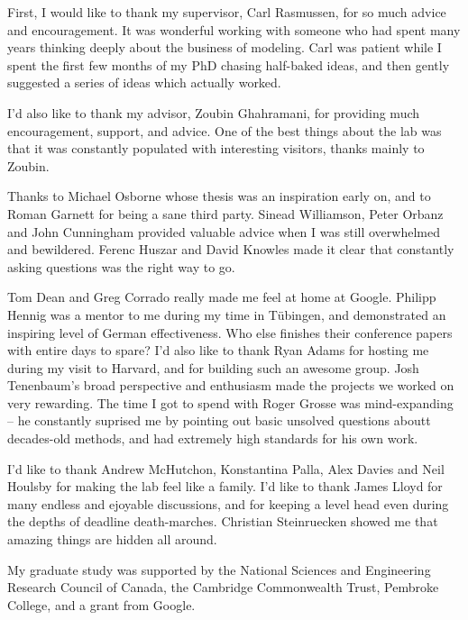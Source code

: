 
\begin{acknowledgements}      


First, I would like to thank my supervisor, Carl Rasmussen, for so much advice and encouragement.
It was wonderful working with someone who had spent many years thinking deeply about the business of modeling.
Carl was patient while I spent the first few months of my PhD chasing half-baked ideas, and then gently suggested a series of ideas which actually worked.

I'd also like to thank my advisor, Zoubin Ghahramani, for providing much encouragement, support, and advice.
One of the best things about the lab was that it was constantly populated with interesting visitors, thanks mainly to Zoubin.

Thanks to Michael Osborne whose thesis was an inspiration early on, and to Roman Garnett for being a sane third party.
Sinead Williamson, Peter Orbanz and John Cunningham provided valuable advice when I was still overwhelmed and bewildered.
Ferenc Huszar and David Knowles made it clear that constantly asking questions was the right way to go.

Tom Dean and Greg Corrado really made me feel at home at Google.
Philipp Hennig was a mentor to me during my time in T\"{u}bingen, and demonstrated an inspiring level of German effectiveness.
Who else finishes their conference papers with entire days to spare?
I'd also like to thank Ryan Adams for hosting me during my visit to Harvard, and for building such an awesome group.
Josh Tenenbaum's broad perspective and enthusiasm made the projects we worked on very rewarding.
The time I got to spend with Roger Grosse was mind-expanding -- he constantly suprised me by pointing out basic unsolved questions aboutt decades-old methods, and had extremely high standards for his own work.

I'd like to thank Andrew McHutchon, Konstantina Palla, Alex Davies and Neil Houlsby for making the lab feel like a family.
I'd like to thank James Lloyd for many endless and ejoyable discussions, and for keeping a level head even during the depths of deadline death-marches.
Christian Steinruecken showed me that amazing things are hidden all around.

My graduate study was supported by the National Sciences and Engineering Research Council of Canada, the Cambridge Commonwealth Trust, Pembroke College, and a grant from Google.

\end{acknowledgements}
